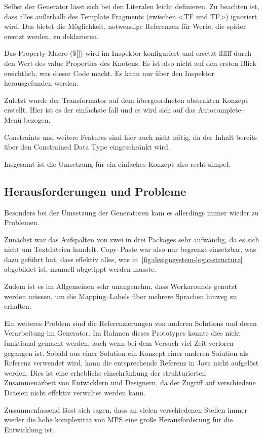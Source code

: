 
Selbst der Generator lässt sich bei den Literalen leicht definieren.
Zu beachten ist, dass alles außerhalb des {\ttfamily Template Fragment}s (zwischen {\ttfamily <TF} und {\ttfamily TF>}) ignoriert wird.
Das bietet die Möglichkeit, notwendige Referenzen für Werte, die später ersetzt werden, zu deklarieren.

Das {\ttfamily Property Macro} ({\ttfamily \$[]}) wird im Inspektor konfiguriert und ersetzt {\ttfamily ffffff} durch den Wert des {\ttfamily value} Properties des Knotens.
Es ist also nicht auf den ersten Blick ersichtlich, was dieser Code macht.
Es kann nur über den Inspektor herausgefunden werden.


Zuletzt wurde der Transformator auf dem übergeordneten abstrakten Konzept erstellt.
Hier ist es der einfachste fall und es wird sich auf das Autocomplete--Menü bezogen.

Constraints und weitere Features sind hier auch nicht nötig, da der Inhalt bereits über den {\ttfamily Constrained Data Type} eingeschränkt wird.

Insgesamt ist die Umsetzung für ein einfaches Konzept also recht simpel.

\subsection{Herausforderungen und Probleme}\label{subsec:herausforderungen-und-probleme}
Besonders bei der Umsetzung der Generatoren kam es allerdings immer wieder zu Problemen.

Zunächst war das Aufspalten von zwei in drei Packages sehr aufwändig, da es sich nicht um Textdateien handelt.
Copy--Paste war also nur begrenzt einsetzbar, was dazu geführt hat, dass effektiv alles, was in~\autoref{fig:designsystem-logic-structure} abgebildet ist, manuell abgetippt werden musste.

Zudem ist es im Allgemeinen sehr unangenehm, dass Workarounds genutzt werden müssen, um die Mapping--Labels über mehrere Sprachen hinweg zu erhalten.

Ein weiteres Problem sind die Referenzierungen von anderen Solutions und deren Verarbeitung im Generator.
Im Rahmen dieses Prototypes konnte dies nicht funktional gemacht werden, auch wenn bei dem Versuch viel Zeit verloren gegangen ist.
Sobald aus einer Solution ein Konzept einer anderen Solution als Referenz verwendet wird, kann die entsprechende Referenz in Java nicht aufgelöst werden.
Dies ist eine erhebliche einschränkung der strukturierten Zusammenarbeit von Entwicklern und Designern, da der Zugriff auf verschiedene Dateien nicht effektiv verwaltet werden kann.

Zusammenfassend lässt sich sagen, dass an vielen verschiedenen Stellen immer wieder die hohe komplexität von \ac{MPS} eine große Herausforderung für die Entwicklung ist.
